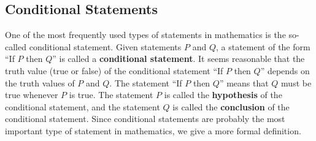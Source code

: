\subsection*{Conditional Statements}\label{SS:conditional}One of the most frequently used types of statements in mathematics is the so-called conditional statement.  Given statements $P$ and $Q$, a statement of the form ``If $P$ then $Q$'' is called a 
\textbf{conditional statement}.
%
%
 It seems reasonable that the truth value (true or false) of the conditional statement 
``If $P$ then $Q$'' depends on the truth values of $P$  and  $Q$.  The statement ``If $P$ then $Q$'' means that $Q$  must be true whenever $P$ is true.  The statement $P$ is called the \textbf{hypothesis}
%
 of the conditional statement, and the statement $Q$ is called the \textbf{conclusion}
%
 of the conditional statement.  
Since conditional statements are probably the most important type of statement in mathematics, we give a more formal definition.

